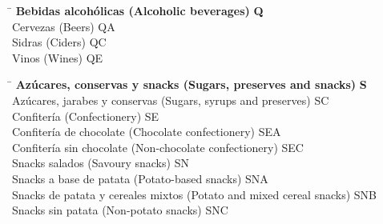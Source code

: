 \begin{small}
    \vspace{-1.25cm}
    
    \begin{tabbing}
    \hspace{15cm} \= \hspace{0cm} \kill
        \textbf{Bebidas alcohólicas (Alcoholic beverages)} \> \textbf{Q} \\
            \hspace{0.5cm}Cervezas (Beers) \> QA \\
            \hspace{0.5cm}Sidras (Ciders) \> QC \\
            \hspace{0.5cm}Vinos (Wines) \> QE \\
    \end{tabbing}

    \vspace{-1.25cm}
    
    \begin{tabbing}
    \hspace{15cm} \= \hspace{0cm} \kill
        \textbf{Azúcares, conservas y snacks (Sugars, preserves and snacks)} \> \textbf{S} \\
            \hspace{0.5cm}Azúcares, jarabes y conservas (Sugars, syrups and preserves) \> SC \\
            \hspace{0.5cm}Confitería (Confectionery) \> SE \\
                \hspace{1cm}Confitería de chocolate (Chocolate confectionery) \> SEA \\
                \hspace{1cm}Confitería sin chocolate (Non-chocolate confectionery) \> SEC \\
            \hspace{0.5cm}Snacks salados (Savoury snacks) \> SN \\
                \hspace{1cm}Snacks a base de patata (Potato-based snacks) \> SNA \\
                \hspace{1cm}Snacks de patata y cereales mixtos (Potato and mixed cereal snacks) \> SNB \\
                \hspace{1cm}Snacks sin patata (Non-potato snacks) \> SNC \\
    \end{tabbing}


\end{small}
